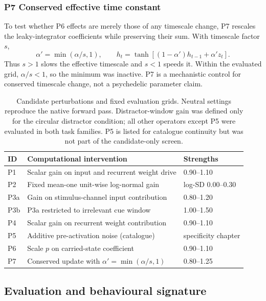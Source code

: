 \subsubsection{P7 Conserved effective time constant}
To test whether P6 effects are merely those of any timescale change, P7
rescales the leaky-integrator coefficients while preserving their sum. With
timescale factor $s$,
\begin{equation}
 \alpha'=\min(\alpha/s,1),\qquad
 h_t=\tanh\!\left[(1-\alpha')h_{t-1}+\alpha'z_t\right].
 \label{eq:p7}
\end{equation}
Thus $s>1$ slows the effective timescale and $s<1$ speeds it. Within the
evaluated grid, $\alpha/s<1$, so the minimum was inactive. P7 is a
mechanistic control for conserved timescale change, not a psychedelic
parameter claim.

\begin{table}[t]
\caption{Candidate perturbations and fixed evaluation grids.
Neutral settings reproduce the native forward pass. Distractor-window gain was
defined only for the circular distractor condition; all other operators except
P5 were evaluated in both task families. P5 is listed for catalogue continuity
but was not part of the candidate-only screen.}
\label{tab:perturbations}
\centering
\begin{tabular}{lll}
\toprule
ID & Computational intervention & Strengths \\
\midrule
P1 & Scalar gain on input and recurrent weight drive
& 0.90--1.10 \\
P2 & Fixed mean-one unit-wise log-normal gain
& log-SD 0.00--0.30 \\
P3a & Gain on stimulus-channel input contribution
& 0.80--1.20 \\
P3b & P3a restricted to irrelevant cue window
& 1.00--1.50 \\
P4 & Scalar gain on recurrent weight contribution
& 0.90--1.10 \\
P5 & Additive pre-activation noise (catalogue)
& specificity chapter \\
P6 & Scale $p$ on carried-state coefficient
& 0.90--1.10 \\
P7 & Conserved update with $\alpha'=\min(\alpha/s,1)$
& 0.80--1.25 \\
\bottomrule
\end{tabular}
\end{table}

\subsection{Evaluation and behavioural signature}

